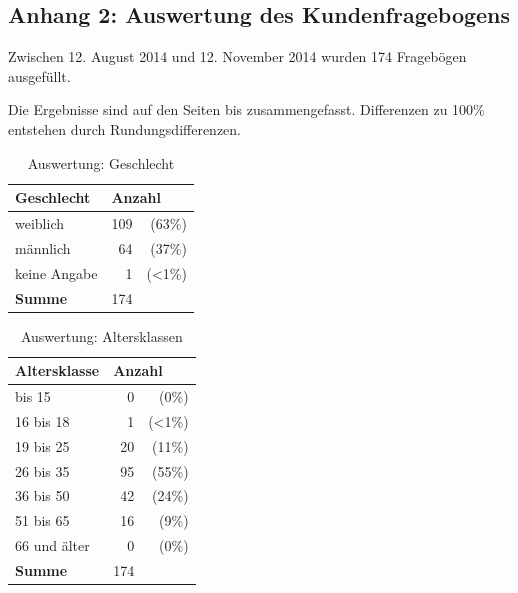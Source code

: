 \newpage
\subsection*{Anhang 2: Auswertung des Kundenfragebogens}

Zwischen 12. August 2014 und 12. November 2014 wurden 174 Fragebögen ausgefüllt. 

Die Ergebnisse sind auf den Seiten \pageref{tab:geschlecht} bis \pageref{tab:usability} zusammengefasst. Differenzen zu 100\% entstehen durch Rundungsdifferenzen.

\begin{table}[H]
\begin{center}
\begin{footnotesize}
\begin{tabular}{| l | r  r |}  \hline                       
  \textbf{Geschlecht}              & \multicolumn{2}{|l|}{\textbf{Anzahl}}   \\ \hline 
  weiblich        &  109 &   (63\%)  \\  \hline  
  männlich        &  64  &   (37\%)  \\  \hline  
  keine Angabe    &  1   &   (<1\%)  \\  \hline  
  \textbf{Summe}  & 174  &   \\  \hline  
\end{tabular}
\end{footnotesize}
\caption{Auswertung: Geschlecht}
\label{tab:geschlecht}
\end{center}
\end{table}

\begin{table}[H]
\begin{center}
\begin{footnotesize}
\begin{tabular}{| l | r  r |}  \hline                       
  \textbf{Altersklasse}              & \multicolumn{2}{|l|}{\textbf{Anzahl}}   \\ \hline 
  bis 15          &  0 &   (0\%)  \\  \hline  
  16 bis 18       &  1 &   (<1\%)  \\  \hline  
  19 bis 25       & 20  &   (11\%)  \\  \hline  
  26 bis 35       & 95  &   (55\%)  \\  \hline  
  36 bis 50       & 42  &   (24\%)  \\  \hline  
  51 bis 65       & 16  &   (9\%)  \\  \hline  
  66 und älter    & 0  &   (0\%)  \\  \hline  
  \textbf{Summe}  & 174  &   \\  \hline  
\end{tabular}
\end{footnotesize}
\caption{Auswertung: Altersklassen}
\label{tab:altersklassen}
\end{center}
\end{table}

